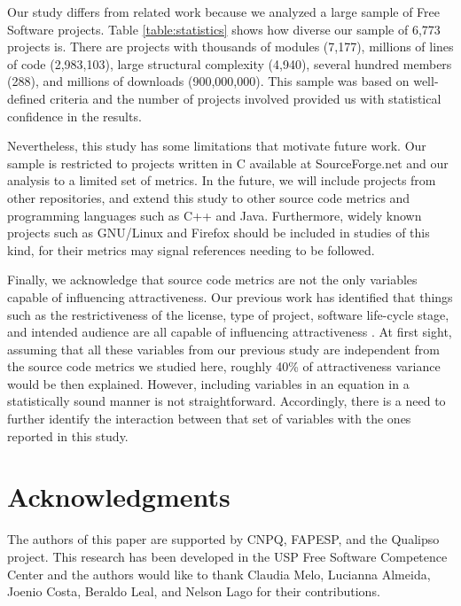 \documentclass[conference]{IEEEtran}
\begin{document}
Our study differs from related work because we analyzed a large
sample of Free Software projects. Table \ref {table:statistics} shows how diverse our sample of
6,773 projects is. There are projects with thousands of modules (7,177),
millions of lines of code (2,983,103), large structural complexity (4,940),
several hundred members (288), and millions of downloads (900,000,000).
This sample was based on well-defined criteria and the number of projects
involved provided us with statistical confidence in the results.

Nevertheless, this study has some limitations that motivate future work.
%
Our sample is restricted to projects written in C available at
SourceForge.net and our analysis to a limited set of metrics.
In the future, we will include projects from other repositories, and extend
this study to other source code metrics and programming languages such as C++
and Java. 
%
Furthermore, widely known projects such as GNU/Linux and Firefox should be
included in studies of this kind, for their metrics may signal references
needing to be followed.

Finally, we acknowledge that source code metrics are not the only
variables capable of influencing attractiveness.
%
Our previous work has identified that things such as the restrictiveness of
the license, type of project, software life-cycle stage, and intended audience
are all capable of influencing attractiveness \cite{Santos2010}.
%
At first sight, assuming that all these variables from our previous study are
independent from the source code metrics we studied here, roughly 40\% of attractiveness variance would be then explained.
%
However, including variables in an equation in a statistically sound manner is not
straightforward. Accordingly, there is a need to further identify the interaction
between that set of variables with the ones reported in this study.

\section*{Acknowledgments}
The authors of this paper are supported by CNPQ, FAPESP, and the Qualipso project.
This research has been developed in the USP Free Software Competence Center and the
authors would like to thank Claudia Melo, Lucianna Almeida, Joenio Costa,
Beraldo Leal, and Nelson Lago for their contributions.



\end{document}
